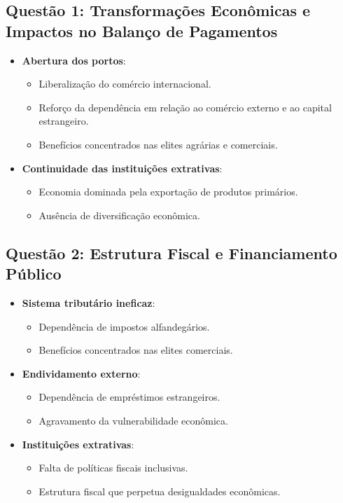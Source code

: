 \documentclass[a4paper,12pt]{article}[abntex2]
\begin{document}
\subsection{\textbf{Questão 1: Transformações Econômicas e Impactos no Balanço de Pagamentos}}

\begin{itemize}
    \item \textbf{Abertura dos portos}:
    \begin{itemize}
        \item Liberalização do comércio internacional.
        \item Reforço da dependência em relação ao comércio externo e ao capital estrangeiro.
        \item Benefícios concentrados nas elites agrárias e comerciais.
    \end{itemize}
    \item \textbf{Continuidade das instituições extrativas}:
    \begin{itemize}
        \item Economia dominada pela exportação de produtos primários.
        \item Ausência de diversificação econômica.
    \end{itemize}
\end{itemize}

\subsection{\textbf{Questão 2: Estrutura Fiscal e Financiamento Público}}

\begin{itemize}
    \item \textbf{Sistema tributário ineficaz}:
    \begin{itemize}
        \item Dependência de impostos alfandegários.
        \item Benefícios concentrados nas elites comerciais.
    \end{itemize}
    \item \textbf{Endividamento externo}:
    \begin{itemize}
        \item Dependência de empréstimos estrangeiros.
        \item Agravamento da vulnerabilidade econômica.
    \end{itemize}
    \item \textbf{Instituições extrativas}:
    \begin{itemize}
        \item Falta de políticas fiscais inclusivas.
        \item Estrutura fiscal que perpetua desigualdades econômicas.
    \end{itemize}
\end{itemize}
\end{document}
